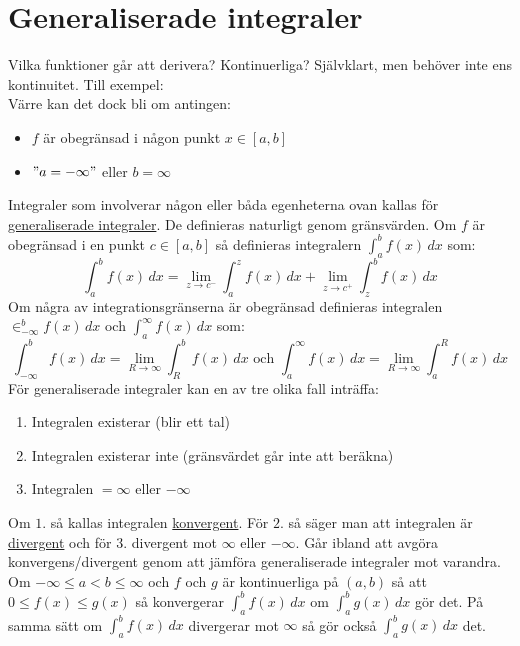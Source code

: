 \chapter{Generaliserade integraler}
Vilka funktioner går att derivera?
Kontinuerliga?
Självklart, men behöver inte ens kontinuitet.
Till exempel:\\

Värre kan det dock bli om antingen:
\begin{itemize}
    \item $f$ är obegränsad i någon punkt $x\in[a,b]$ %
    \item $"a=-\infty"$ eller $b=\infty$ %
\end{itemize}
Integraler som involverar någon eller båda egenheterna ovan kallas för \\
\underline{generaliserade integraler}.
De definieras naturligt genom gränsvärden.
Om $f$ är obegränsad i en punkt $c\in[a,b]$ så definieras integralern $\int_a^b f(x)\, dx$ som:
\begin{equation*}
    \int_a^b f(x)\, dx =\lim_{z\to c^-}\int_a^z f(x)\, dx+ \lim_{z\to c^+}\int_z^b f(x)\, dx
\end{equation*}
Om några av integrationsgränserna är obegränsad definieras integralen $\in_{-\infty}^b f(x)\, dx$
och $\int_a^\infty f(x)\, dx$ som:
\begin{equation*}
    \int_{-\infty}^b f(x)\, dx=\lim_{R\to \infty}\int_R^b f(x)\, dx\text{ och }\int_a^\infty f(x)\, dx=\lim_{R\to \infty}\int_a^R f(x)\, dx
\end{equation*}
För generaliserade integraler kan en av tre olika fall inträffa:
\begin{enumerate}
    \item Integralen existerar (blir ett tal)
    \item Integralen existerar inte (gränsvärdet går inte att beräkna)
    \item Integralen $=\infty$ eller $-\infty$
\end{enumerate}
Om $1.$ så kallas integralen \underline{konvergent}.
För $2.$ så säger man att integralen är \underline{divergent} och för $3.$ divergent mot $\infty$ eller $-\infty$.
Går ibland att avgöra konvergens/divergent genom att jämföra generaliserade integraler mot varandra.
Om $-\infty\leq a<b \leq\infty$ och $f$ och $g$ är kontinuerliga på $(a,b)$ så att $0\leq f(x)\leq g(x)$ så konvergerar $\int_a^b f(x)\, dx$ om $\int_a^b g(x)\, dx$ gör det.
På samma sätt om $\int_a^b f(x)\, dx$ divergerar mot $\infty$ så gör också $\int_a^b g(x)\, dx$ det.


